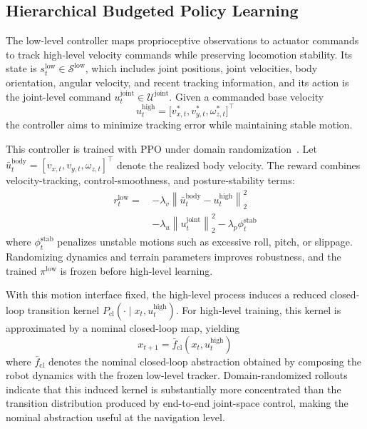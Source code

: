 \documentclass{article}
\begin{document}
\subsection{Hierarchical Budgeted Policy Learning}

The low-level controller maps proprioceptive observations to actuator commands to track high-level velocity commands while preserving locomotion stability. Its state is $s_t^{\mathrm{low}} \in \mathcal{S}^{\mathrm{low}}$, which includes joint positions, joint velocities, body orientation, angular velocity, and recent tracking information, and its action is the joint-level command $u_t^{\mathrm{joint}} \in \mathcal{U}^{\mathrm{joint}}$. Given a commanded base velocity
\begin{equation}
u_t^{\mathrm{high}} = \big[v_{x,t}^{\ast}, v_{y,t}^{\ast}, \omega_{z,t}^{\ast}\big]^{\top}
\end{equation}
the controller aims to minimize tracking error while maintaining stable motion.

This controller is trained with PPO under domain randomization~\citep{schulman2017,tobin2017}. Let $\bar{u}_t^{\mathrm{body}}=[v_{x,t},v_{y,t},\omega_{z,t}]^{\top}$ denote the realized body velocity. The reward combines velocity-tracking, control-smoothness, and posture-stability terms:
\begin{equation}
\begin{aligned}
r_t^{\mathrm{low}}
=\,&-\lambda_v \left\| \bar{u}_t^{\mathrm{body}}-u_t^{\mathrm{high}} \right\|_2^2 \\
&-\lambda_u \left\| u_t^{\mathrm{joint}} \right\|_2^2 -\lambda_p \phi_t^{\mathrm{stab}}
\end{aligned}
\end{equation}
where $\phi_t^{\mathrm{stab}}$ penalizes unstable motions such as excessive roll, pitch, or slippage. Randomizing dynamics and terrain parameters improves robustness, and the trained $\pi^{\mathrm{low}}$ is frozen before high-level learning.

With this motion interface fixed, the high-level process induces a reduced closed-loop transition kernel $P_{\mathrm{cl}}(\cdot\mid x_t,u_t^{\mathrm{high}})$. For high-level training, this kernel is approximated by a nominal closed-loop map, yielding
\begin{equation}
x_{t+1}=\bar{f}_{\mathrm{cl}}\!\left(x_t,u_t^{\mathrm{high}}\right)
\end{equation}
where $\bar{f}_{\mathrm{cl}}$ denotes the nominal closed-loop abstraction obtained by composing the robot dynamics with the frozen low-level tracker. Domain-randomized rollouts indicate that this induced kernel is substantially more concentrated than the transition distribution produced by end-to-end joint-space control, making the nominal abstraction useful at the navigation level.
\end{document}
